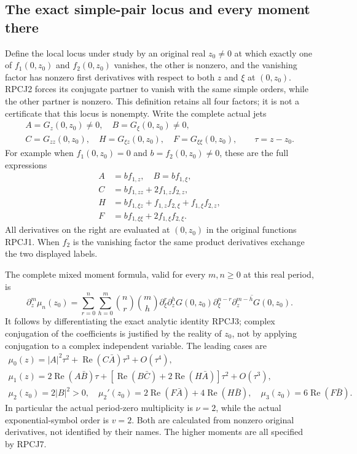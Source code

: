\subsection{The exact simple-pair locus and every moment there}
Define the local locus under study by an original real
$z_0\ne0$ at which exactly one of $f_1(0,z_0)$ and $f_2(0,z_0)$
vanishes, the other is nonzero, and the vanishing factor has nonzero
first derivatives with respect to both $z$ and $\xi$ at $(0,z_0)$.
RPCJ2 forces its conjugate partner to vanish with the same simple
orders, while the other partner is nonzero. This definition retains
all four factors; it is not a certificate that this locus is nonempty.
Write the complete actual jets
\[
 \begin{gathered}
 A=G_z(0,z_0)\ne0,\quad B=G_\xi(0,z_0)\ne0,\\
 C=G_{zz}(0,z_0),\quad H=G_{\xi z}(0,z_0),\quad
 F=G_{\xi\xi}(0,z_0),\qquad \tau=z-z_0.
 \end{gathered}\tag{RPCJ5}
\]
For example when $f_1(0,z_0)=0$ and $b=f_2(0,z_0)\ne0$,
these are the full expressions
\[
 \begin{split}
 A&=b f_{1,z},\quad B=b f_{1,\xi},\\
 C&=b f_{1,zz}+2f_{1,z}f_{2,z},\\
 H&=b f_{1,\xi z}+f_{1,z}f_{2,\xi}+f_{1,\xi}f_{2,z},\\
 F&=b f_{1,\xi\xi}+2f_{1,\xi}f_{2,\xi}.
 \end{split}\tag{RPCJ6}
\]
All derivatives on the right are evaluated at $(0,z_0)$ in the
original functions RPCJ1. When $f_2$ is the vanishing factor the
same product derivatives exchange the two displayed labels.

The complete mixed moment formula, valid for every $m,n\ge0$ at
this real period, is
\[
 \partial_z^m\mu_n(z_0)=
 \sum_{r=0}^n\sum_{h=0}^m\binom nr\binom mh
 \partial_\xi^r\partial_z^hG(0,z_0)
 \overline{\partial_\xi^{n-r}\partial_z^{m-h}G(0,z_0)}.
 \tag{RPCJ7}
\]
It follows by differentiating the exact analytic identity RPCJ3;
complex conjugation of the coefficients is justified by the reality
of $z_0$, not by applying conjugation to a complex independent variable.
The leading cases are
\[
 \begin{gathered}
 \mu_0(z)=|A|^2\tau^2+\operatorname{Re}(C\bar A)\tau^3+O(\tau^4),\\
 \mu_1(z)=2\operatorname{Re}(A\bar B)\tau
       +[\operatorname{Re}(B\bar C)+2\operatorname{Re}(H\bar A)]
                                      \tau^2+O(\tau^3),\\
 \mu_2(z_0)=2|B|^2>0,\quad
 \mu_2'(z_0)=2\operatorname{Re}(F\bar A)+4\operatorname{Re}(H\bar B),
 \quad \mu_3(z_0)=6\operatorname{Re}(F\bar B).
 \end{gathered}\tag{RPCJ8}
\]
In particular the actual period-zero multiplicity is $\nu=2$,
while the actual exponential-symbol order is $v=2$.
Both are calculated from nonzero original derivatives, not identified
by their names. The higher moments are all specified by RPCJ7.

